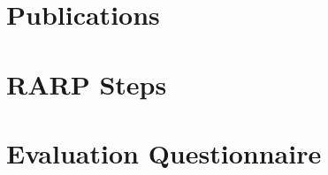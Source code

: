 
\appendix%



\chapter{Publications}\label{apn:publications}

\begin{refsection}
\nocite{abinahed:icsec:2017}
\nocite{abinahed:wccm:2018}
\nocite{pan:iros:2018}
\nocite{pan:wafr:2018}
\nocite{halwani:imsh:2019}
\nocite{boukaram:sjsc:2019}
\nocite{boukaram:atms:2019}
\nocite{biao:icra:2019}
\nocite{abinahed:hsmr:2019}
\nocite{abinahed:embc:2019}
\nocite{palliyali:sws:2019}
\printbibliography[heading=none,resetnumbers=true]
\end{refsection}


\chapter{RARP Steps}\label{apn:rarp_steps}

\chapter{Evaluation Questionnaire}\label{apn:evaluation_questionnaire}



